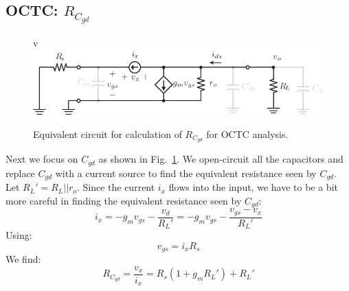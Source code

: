 \subsection{OCTC: \texorpdfstring{$R_{C_{gd}}$}{Equivalent Gate-Drain Capacitor Resistance}}
\begin{figure}[tb]
v\includegraphics[scale=1]{cs_amp_ac_caps_Cgd}
\caption{Equivalent circuit for calculation of $R_{C_{gd}}$ for OCTC analysis.} \label{fig:cs_amp_ac_caps_Cgd}
\end{figure}
Next we focus on $C_{gd}$ as shown in Fig.~\ref{fig:cs_amp_ac_caps_Cgd}.  We open-circuit all the capacitors and replace $C_{gd}$ with a current source to find the equivalent resistance seen by $C_{gd}$.  Let $R_L' = R_L || r_o$.  Since the current $i_x$ flows into the input, we have to be a bit more careful in finding the equivalent resistance seen by $C_{gd}$:
    \begin{equation} 
        {i_x} = -{g_m}{v_{gs}} - \frac{{{v_d}}}{{R_L'}} = -{g_m}{v_{gs}} - \frac{{{v_{gs}}-{v_x} }}{{R_L'}} 
    \end{equation}
Using:
    \begin{equation} 
        {v_{gs}} =  {i_x}R_{s} 
    \end{equation}
We find:
    \begin{equation} 
        {R_{C_{gd}}} = \frac{{{v_x}}}{{{i_x}}} = R_{s}(1 + {g_m}R_L') + R_L' 
    \end{equation}
